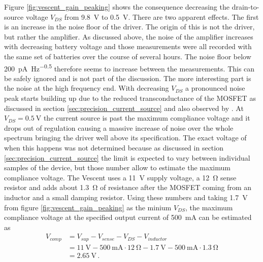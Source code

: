 Figure \ref{fig:vescent_gain_peaking} shows the consequence decreasing the drain-to-source voltage $V_{DS}$ from \qty{9.8}{\V} to \qty{0.5}{\V}. There are two apparent effects. The first is an increase in the noise floor of the driver. The origin of this is not the driver, but rather the amplifier. As discussed above, the noise of the amplifier increases with decreasing battery voltage and those measurements were all recorded with the same set of batteries over the course of several hours. The noise floor below \qty{200}{\pA \per \Hz\tothe{0.5}} therefore seems to increase between the measurements. This can be safely ignored and is not part of the discussion. The more interesting part is the noise at the high frequency end. With decreasing $V_{DS}$ a pronounced noise peak starts building up due to the reduced transconductance of the MOSFET as discussed in section \ref{sec:precision_current_source} and also observed by \citeauthor{laser_driver_mosfet_noise} \cite{laser_driver_mosfet_noise}. At $V_{DS} = \qty{0.5}{\V}$ the current source is past the maximum compliance voltage and it drops out of regulation causing a massive increase of noise over the whole spectrum bringing the driver well above its specification. The exact voltage of when this happens was not determined because as discussed in section \ref{sec:precision_current_source} the limit is expected to vary between individual samples of the device, but those number allow to estimate the maximum compliance voltage. The Vescent  uses a \qty{11}{\V} supply voltage, a \qty{12}{\ohm} sense resistor and adds about \qty{1.3}{\ohm} of resistance after the MOSFET coming from an inductor and a small damping resistor. Using these numbers  and taking \qty{1.7}{\V} from figure \ref{fig:vescent_gain_peaking} as the minium $V_{DS}$, the maximum compliance voltage at the specified output current of \qty{500}{\mA} can be estimated as
\begin{align}
    V_{comp} &= V_{sup} - V_{sense} - V_{DS} - V_{inductor} \nonumber\\
    &= \qty{11}{\V} - \qty{500}{\mA} \cdot \qty{12}{\ohm} - \qty{1.7}{\V} - \qty{500}{\mA} \cdot \qty{1.3}{\ohm} \nonumber\\
    &= \qty{2.65}{\V}\,. \nonumber
\end{align}

